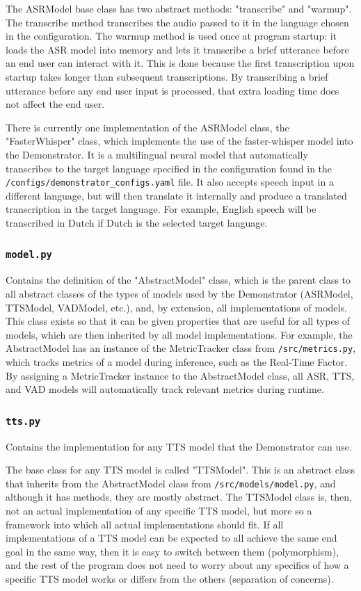 The ASRModel base class has two abstract methods: "transcribe" and "warmup".
The transcribe method transcribes the audio passed to it in the language chosen in the configuration.
The warmup method is used once at program startup: it loads the ASR model into memory and lets it transcribe a brief utterance before an end user can interact with it.
This is done because the first transcription upon startup takes longer than subsequent transcriptions.
By transcribing a brief utterance before any end user input is processed, that extra loading time does not affect the end user.

There is currently one implementation of the ASRModel class, the "FasterWhisper" class, which implements the use of the faster-whisper model into the Demonstrator.
It is a multilingual neural model that automatically transcribes to the target language specified in the configuration found in the \texttt{/configs/demonstrator\_configs.yaml} file.
It also accepts speech input in a different language, but will then translate it internally and produce a translated transcription in the target language.
For example, English speech will be transcribed in Dutch if Dutch is the selected target language.

\subsubsection{\texttt{model.py}}
Contains the definition of the "AbstractModel" class, which is the parent class to all abstract classes of the types of models used by the Demonstrator (ASRModel, TTSModel, VADModel, etc.), and, by extension, all implementations of models.
This class exists so that it can be given properties that are useful for all types of models, which are then inherited by all model implementations.
For example, the AbstractModel has an instance of the MetricTracker class from \texttt{/src/metrics.py}, which tracks metrics of a model during inference, such as the Real-Time Factor.
By assigning a MetricTracker instance to the AbstractModel class, all ASR, TTS, and VAD models will automatically track relevant metrics during runtime.

\subsubsection{\texttt{tts.py}}
Contains the implementation for any TTS model that the Demonstrator can use.

The base class for any TTS model is called "TTSModel".
This is an abstract class that inherits from the AbstractModel class from \texttt{/src/models/model.py}, and although it has methods, they are mostly abstract.
The TTSModel class is, then, not an actual implementation of any specific TTS model, but more so a framework into which all actual implementations should fit.
If all implementations of a TTS model can be expected to all achieve the same end goal in the same way, then it is easy to switch between them (polymorphism), and the rest of the program does not need to worry about any specifics of how a specific TTS model works or differs from the others (separation of concerns).

